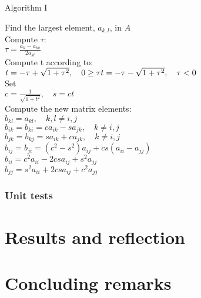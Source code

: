 \documentclass[11pt,a4paper,english]{article}
\numberwithin{equation}{section}
\begin{document}
\centerline{Algorithm I}
\begin{tcolorbox}
Find the largest element, $a_{k,l}$, in $A$ \\
Compute $\tau:$ \\
$ \tau = \frac{a_{ll}-a_{kk}}{2a_{kl}}$ \\
Compute t according to:  \\
$t=  -\tau + \sqrt{1+\tau^2}, \quad   0  \geq \tau \\
t=  -\tau - \sqrt{1+\tau^2}, \quad   \tau <  0 $ \\
Set \\
$ c= \frac{1}{\sqrt{1+t^2}}, \quad s= ct$ \\
Compute the new matrix elements: \\
$ b_{kl} = a_{kl}, \quad k,l \neq i,j$ \\
$ b_{ik} = b_{ki} = ca_{ik}-sa_{jk}, \quad k \neq i,j$ \\
$ b_{jk} = b_{kj} = sa_{ik}+ca_{jk}, \quad k \neq i,j$ \\
$ b_{ij} = b_{ji} = (c^2 - s^2)a_{ij} + cs(a_{ii}-a_{jj}) $ \\
$ b_{ii} = c^2 a_{ii} - 2csa_{ij} + s^2 a_{jj} $ \\
$ b_{jj} = s^2 a_{ii} + 2csa_{ij} + c^2 a_{jj} $ \\

\end{tcolorbox} 

\subsubsection{Unit tests}


\section{Results and reflection}

\section{Concluding remarks }
\end{document}
